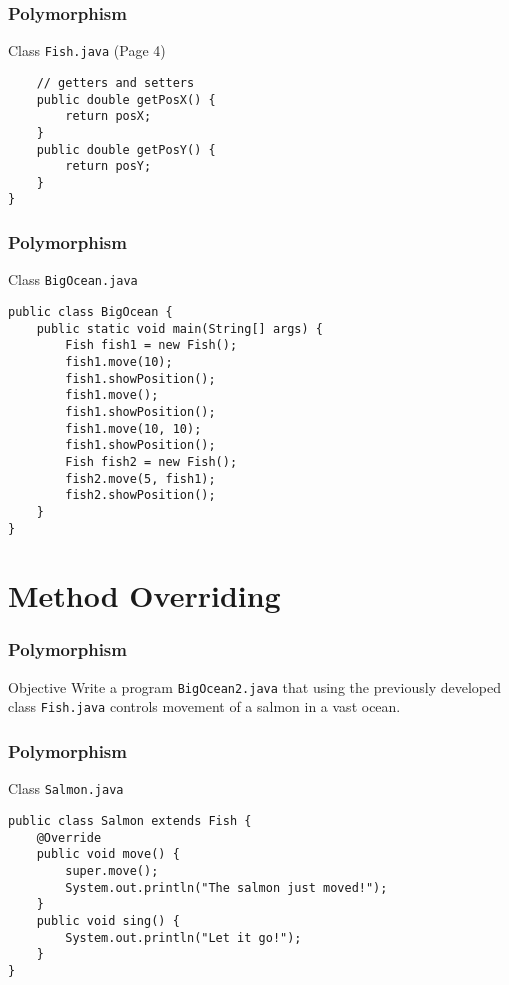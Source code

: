 \documentclass[10pt, compress]{beamer}
\begin{document}
\begin{frame}[fragile]
	\frametitle{Polymorphism}
	\begin{block}{Class \texttt{Fish.java} (Page 4)}
		\begin{verbatim}
	// getters and setters
	public double getPosX() {
		return posX;
	}
	public double getPosY() {
		return posY;
	}
}
		\end{verbatim}
	\end{block}
\end{frame}

\begin{frame}[fragile]
	\frametitle{Polymorphism}
	\begin{block}{Class \texttt{BigOcean.java}}
		\begin{verbatim}
public class BigOcean {
	public static void main(String[] args) {
		Fish fish1 = new Fish();
		fish1.move(10);
		fish1.showPosition();
		fish1.move();
		fish1.showPosition();
		fish1.move(10, 10);
		fish1.showPosition();
		Fish fish2 = new Fish();
		fish2.move(5, fish1);
		fish2.showPosition();
	}
}
		\end{verbatim}
	\end{block}
\end{frame}

\section{Method Overriding}

\begin{frame}[fragile]
	\frametitle{Polymorphism}
	\begin{block}{Objective}
		Write a program \texttt{BigOcean2.java} that using the previously developed class \texttt{Fish.java} controls movement of a salmon in a vast ocean.
	\end{block}
\end{frame}

\begin{frame}[fragile]
	\frametitle{Polymorphism}
	\begin{block}{Class \texttt{Salmon.java}}
		\begin{verbatim}
public class Salmon extends Fish {
	@Override
	public void move() {
		super.move();
		System.out.println("The salmon just moved!");
	}
	public void sing() {
		System.out.println("Let it go!");
	}
}
		\end{verbatim}
	\end{block}
\end{frame}
\end{document}
